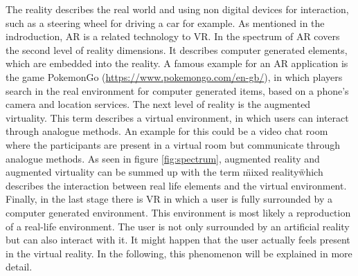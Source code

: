 The reality describes the real world and using non digital devices for interaction, such as a steering wheel for driving a car for example. As mentioned in the indroduction, AR is a related technology to VR. In the spectrum of \cite{Tham.2018} AR covers the second level of reality dimensions. It describes computer generated elements, which are embedded into the reality. A famous example for an AR application is the game PokemonGo (\url{https://www.pokemongo.com/en-gb/}), in which players search in the real environment for computer generated items, based on a phone's camera and location services. The next level of reality is the augmented virtuality. This term describes a virtual environment, in which users can interact through analogue methods. An example for this could be a video chat room where the participants are present in a virtual room but communicate through analogue methods. As seen in figure \ref{fig:spectrum}, augmented reality and augmented virtuality can be summed up with the term \"mixed reality\" which describes the interaction between real life elements and the virtual environment. Finally, in the last stage there is VR in which a user is fully surrounded by a computer generated environment. This environment is most likely a reproduction of a real-life environment. The user is not only surrounded by an artificial reality but can also interact with it. It might happen that the user actually feels present in the virtual reality. In the following, this phenomenon will be explained in more detail.

